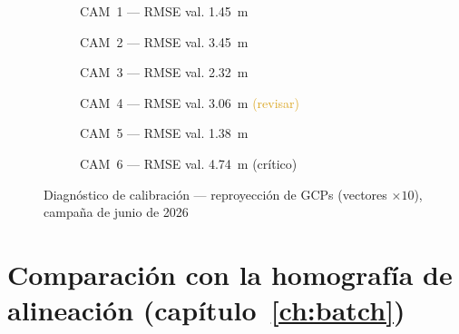 \begin{figure}[H]
  \centering
  \begin{subfigure}[b]{0.48\textwidth}
    \caption{CAM~1 — RMSE val. 1.45~m}
  \end{subfigure}
  \hfill
  \begin{subfigure}[b]{0.48\textwidth}
    \caption{CAM~2 — RMSE val. 3.45~m}
  \end{subfigure}

  \vspace{0.4cm}
  \begin{subfigure}[b]{0.48\textwidth}
    \caption{CAM~3 — RMSE val. 2.32~m}
  \end{subfigure}
  \hfill
  \begin{subfigure}[b]{0.48\textwidth}
    \caption{CAM~4 — RMSE val. 3.06~m \textcolor{Goldenrod}{(revisar)}}
  \end{subfigure}

  \vspace{0.4cm}
  \begin{subfigure}[b]{0.48\textwidth}
    \caption{CAM~5 — RMSE val. 1.38~m}
  \end{subfigure}
  \hfill
  \begin{subfigure}[b]{0.48\textwidth}
    \caption{CAM~6 — RMSE val. 4.74~m \textcolor{BrickRed}{(crítico)}}
  \end{subfigure}

  \caption{Diagnóstico de calibración — reproyección de GCPs (vectores $\times10$), campaña de junio de 2026}
  \label{fig:diagnostics}
\end{figure}

\section{Comparación con la homografía de alineación (capítulo~\ref{ch:batch})}
\label{sec:dos-homografias}

